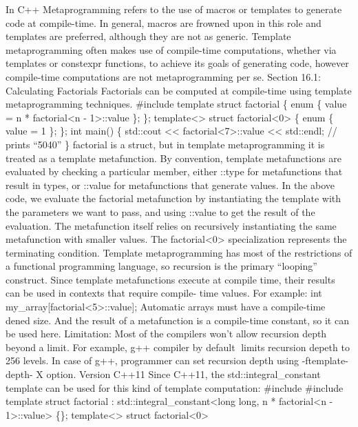 In C++ Metaprogramming refers to the use of macros or templates to
generate code at compile-time. In general, macros are frowned upon in
this role and templates are preferred, although they are not as generic.
Template metaprogramming often makes use of compile-time computations,
whether via templates or constexpr functions, to achieve its goals of
generating code, however compile-time computations are not
metaprogramming per se. Section 16.1: Calculating Factorials Factorials
can be computed at compile-time using template metaprogramming
techniques. \#include template struct factorial \{ enum \{ value = n *
factorial\textless n - 1\textgreater::value \}; \};
template\textless\textgreater{} struct factorial\textless0\textgreater{}
\{ enum \{ value = 1 \}; \}; int main() \{ std::cout
\textless\textless{} factorial\textless7\textgreater::value
\textless\textless{} std::endl; // prints ``5040'' \} factorial is a
struct, but in template metaprogramming it is treated as a template
metafunction. By convention, template metafunctions are evaluated by
checking a particular member, either ::type for metafunctions that
result in types, or ::value for metafunctions that generate values. In
the above code, we evaluate the factorial metafunction by instantiating
the template with the parameters we want to pass, and using ::value to
get the result of the evaluation. The metafunction itself relies on
recursively instantiating the same metafunction with smaller values. The
factorial\textless0\textgreater{} specialization represents the
terminating condition. Template metaprogramming has most of the
restrictions of a functional programming language, so recursion is the
primary ``looping'' construct. Since template metafunctions execute at
compile time, their results can be used in contexts that require
compile- time values. For example: int
my\_array{[}factorial\textless5\textgreater::value{]}; Automatic arrays
must have a compile-time dened size. And the result of a metafunction is
a compile-time constant, so it can be used here. Limitation: Most of the
compilers won't allow recursion depth beyond a limit. For example, g++
compiler by default limits recursion depeth to 256 levels. In case of
g++, programmer can set recursion depth using -ftemplate-depth- X
option. Version C++11 Since C++11, the std::integral\_constant template
can be used for this kind of template computation: \#include \#include
template struct factorial : std::integral\_constant\textless long long,
n * factorial\textless n - 1\textgreater::value\textgreater{} \{\};
template\textless\textgreater{} struct factorial\textless0\textgreater{}
